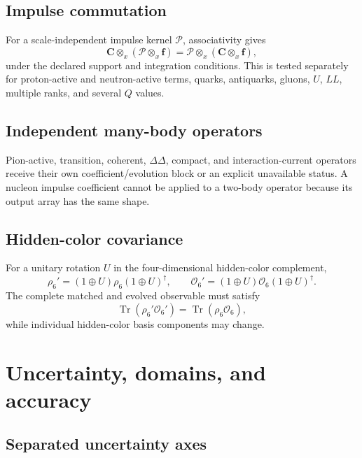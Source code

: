 \documentclass[11pt]{article}
\newcommand{\Tr}{\operatorname{Tr}}
\newcommand{\cO}{\mathcal O}
\newcommand{\cP}{\mathcal P}
\newcommand{\otimesx}{\mathbin{\otimes_x}}
\begin{document}
\subsection{Impulse commutation}

For a scale-independent impulse kernel \(\cP\), associativity gives
\begin{equation}
 \bm C\otimesx(\cP\otimesx\bm f)
 =
 \cP\otimesx(\bm C\otimesx\bm f),
 \label{eq:impulse-commutation}
\end{equation}
under the declared support and integration conditions.  This is tested separately for proton-active and neutron-active terms, quarks, antiquarks, gluons, \(U\), \(LL\), multiple ranks, and several \(Q\) values.

\subsection{Independent many-body operators}

Pion-active, transition, coherent, \(\Delta\Delta\), compact, and interaction-current operators receive their own coefficient/evolution block or an explicit unavailable status.  A nucleon impulse coefficient cannot be applied to a two-body operator because its output array has the same shape.

\subsection{Hidden-color covariance}

For a unitary rotation \(U\) in the four-dimensional hidden-color complement,
\begin{equation}
 \rho_6'=(1\oplus U)\rho_6(1\oplus U)^\dagger,
 \qquad
 \cO_6'=(1\oplus U)\cO_6(1\oplus U)^\dagger.
 \label{eq:hidden-transform}
\end{equation}
The complete matched and evolved observable must satisfy
\begin{equation}
 \Tr(\rho_6'\cO_6')=\Tr(\rho_6\cO_6),
 \label{eq:hidden-invariance}
\end{equation}
while individual hidden-color basis components may change.

\section{Uncertainty, domains, and accuracy}
\label{sec:uncertainty}

\subsection{Separated uncertainty axes}
\end{document}
